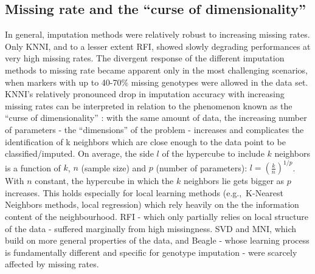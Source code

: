 \subsection{Missing rate and the ``curse of dimensionality''}
\label{sec:missing_rate_curse_dimensionality}
In general, imputation methods were relatively robust to increasing missing rates. Only KNNI, and to a lesser extent RFI, showed slowly degrading performances at very high missing rates. The divergent response of the different imputation methods to missing rate became apparent only in the most challenging scenarios, when markers with up to 40-70\% missing genotypes were allowed in the data set.\\
KNNI's relatively pronounced drop in imputation accuracy with increasing missing rates can be interpreted in relation to the phenomenon known as the ``curse of dimensionality'' \cite{bellman_dynamic_1957,marimont_nearest_1979}: with the same amount of data, the increasing number of parameters - the ``dimensions'' of the problem - increases and complicates the identification of k neighbors which are close enough to the data point to be classified/imputed. 
On average, the side $l$ of the hypercube to include $k$ neighbors is a function of $k$, $n$ (sample size) and $p$ (number of parameters): $l = \left ( \frac{k}{n} \right )^{1/p}$. With $n$ constant, the hypercube in which the $k$ neighbors lie gets bigger as $p$ increases. This holds especially for local learning methods (e.g.,~K-Nearest Neighbors methods, local regression) which rely heavily on the the information content of the neighbourhood. RFI - which only partially relies on local structure of the data - suffered marginally from high missingness. SVD and MNI, which build on more general properties of the data, and Beagle - whose learning process is fundamentally different and specific for genotype imputation - were scarcely affected by missing rates.

